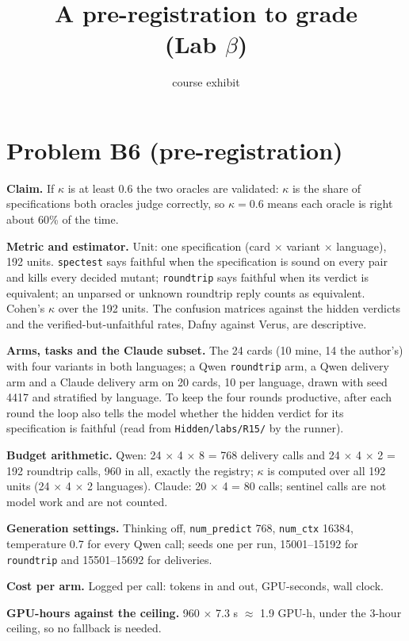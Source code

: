 \documentclass[11pt]{article}
\title{A pre-registration to grade \\ \large (Lab $\beta$)}
\author{course exhibit}
\date{}
\begin{document}
\maketitle
\sloppy
\section*{Problem B6 (pre-registration)}\label{ans:B6}
\begin{answer}
\textbf{Claim.} If $\kappa$ is at least 0.6 the two oracles are validated:
$\kappa$ is the share of specifications both oracles judge correctly, so
$\kappa = 0.6$ means each oracle is right about 60\% of the time.

\textbf{Metric and estimator.} Unit: one specification (card $\times$ variant
$\times$ language), 192 units. \texttt{spectest} says faithful when the
specification is sound on every pair and kills every decided mutant;
\texttt{roundtrip} says faithful when its verdict is equivalent; an unparsed or
unknown roundtrip reply counts as equivalent. Cohen's $\kappa$ over the 192
units. The confusion matrices against the hidden verdicts and the
verified-but-unfaithful rates, Dafny against Verus, are descriptive.

\textbf{Arms, tasks and the Claude subset.} The 24 cards (10 mine, 14 the
author's) with four variants in both languages; a Qwen \texttt{roundtrip} arm,
a Qwen delivery arm and a Claude delivery arm on 20 cards, 10 per language,
drawn with seed 4417 and stratified by language. To
keep the four rounds productive, after each round the loop also tells the model
whether the hidden verdict for its specification is faithful (read from
\texttt{Hidden/labs/R15/} by the runner).

\textbf{Budget arithmetic.} Qwen: 24 $\times$ 4 $\times$ 8 = 768 delivery
calls and 24 $\times$ 4 $\times$ 2 = 192 roundtrip calls, 960 in all, exactly
the registry; $\kappa$ is computed over all 192 units (24 $\times$ 4 $\times$ 2
languages). Claude: 20 $\times$ 4 = 80 calls; sentinel calls are not model work
and are not counted.

\textbf{Generation settings.} Thinking off, \texttt{num\_predict} 768,
\texttt{num\_ctx} 16384, temperature 0.7 for every Qwen call; seeds one per
run, 15001--15192 for \texttt{roundtrip} and 15501--15692 for deliveries.

\textbf{Cost per arm.} Logged per call: tokens in and out, GPU-seconds, wall
clock.

\textbf{GPU-hours against the ceiling.} 960 $\times$ 7.3 s $\approx$ 1.9
GPU-h, under the 3-hour ceiling, so no fallback is needed.


\end{answer}
\end{document}

